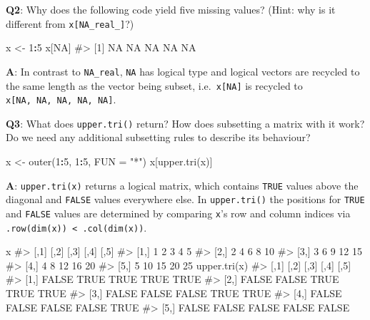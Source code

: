 \documentclass[
]{krantz}
\makeatletter
\newenvironment{Shaded}{\begin{snugshade}}{\end{snugshade}}
\newcommand{\CommentTok}[1]{\textcolor[rgb]{0.56,0.35,0.01}{\textit{#1}}}
\newcommand{\DataTypeTok}[1]{\textcolor[rgb]{0.13,0.29,0.53}{#1}}
\newcommand{\DecValTok}[1]{\textcolor[rgb]{0.00,0.00,0.81}{#1}}
\newcommand{\KeywordTok}[1]{\textcolor[rgb]{0.13,0.29,0.53}{\textbf{#1}}}
\newcommand{\NormalTok}[1]{#1}
\newcommand{\OperatorTok}[1]{\textcolor[rgb]{0.81,0.36,0.00}{\textbf{#1}}}
\newcommand{\OtherTok}[1]{\textcolor[rgb]{0.56,0.35,0.01}{#1}}
\newcommand{\StringTok}[1]{\textcolor[rgb]{0.31,0.60,0.02}{#1}}
\newenvironment{kframe}{%
\medskip{}
\setlength{\fboxsep}{.8em}
 \def\at@end@of@kframe{}%
 \ifinner\ifhmode%
  \def\at@end@of@kframe{\end{minipage}}%
  \begin{minipage}{\columnwidth}%
 \fi\fi%
 \def\FrameCommand##1{\hskip\@totalleftmargin \hskip-\fboxsep
 \colorbox{shadecolor}{##1}\hskip-\fboxsep
     \hskip-\linewidth \hskip-\@totalleftmargin \hskip\columnwidth}%
 \MakeFramed {\advance\hsize-\width
   \@totalleftmargin\z@ \linewidth\hsize
   \@setminipage}}%
 {\par\unskip\endMakeFramed%
 \at@end@of@kframe}
\renewenvironment{Shaded}{\begin{kframe}}{\end{kframe}}
\renewcommand{\KeywordTok} [1]{\textcolor[rgb]{0.00,0.44,0.13}{{#1}}}
\renewcommand{\DataTypeTok}[1]{\textcolor[rgb]{0.56,0.13,0.00}{{#1}}}
\renewcommand{\DecValTok}  [1]{\textcolor[rgb]{0.25,0.63,0.44}{{#1}}}
\renewcommand{\StringTok}  [1]{\textcolor[rgb]{0.25,0.44,0.63}{{#1}}}
\renewcommand{\CommentTok} [1]{\textcolor[rgb]{0.38,0.63,0.69}{{#1}}}
\renewcommand{\OtherTok}   [1]{\textcolor[rgb]{0.00,0.44,0.13}{{#1}}}
\renewcommand{\NormalTok}  [1]{{#1}}
\makeatother
\begin{document}
\textbf{{Q2}}: Why does the following code yield five missing values? (Hint: why is it different from \texttt{x{[}NA\_real\_{]}}?)

\begin{Shaded}
\begin{Highlighting}[]
\NormalTok{x <-}\StringTok{ }\DecValTok{1}\OperatorTok{:}\DecValTok{5}
\NormalTok{x[}\OtherTok{NA}\NormalTok{]}
\CommentTok{#> [1] NA NA NA NA NA}
\end{Highlighting}
\end{Shaded}

\textbf{{A}}: In contrast to \texttt{NA\_real}, \texttt{NA} has logical type and logical vectors are recycled to the same length as the vector being subset, i.e.~\texttt{x{[}NA{]}} is recycled to \texttt{x{[}NA,\ NA,\ NA,\ NA,\ NA{]}}.

\textbf{{Q3}}: What does \texttt{upper.tri()} return? How does subsetting a matrix with it work? Do we need any additional subsetting rules to describe its behaviour?

\begin{Shaded}
\begin{Highlighting}[]
\NormalTok{x <-}\StringTok{ }\KeywordTok{outer}\NormalTok{(}\DecValTok{1}\OperatorTok{:}\DecValTok{5}\NormalTok{, }\DecValTok{1}\OperatorTok{:}\DecValTok{5}\NormalTok{, }\DataTypeTok{FUN =} \StringTok{"*"}\NormalTok{)}
\NormalTok{x[}\KeywordTok{upper.tri}\NormalTok{(x)]}
\end{Highlighting}
\end{Shaded}

\textbf{{A}}: \texttt{upper.tri(x)} returns a logical matrix, which contains \texttt{TRUE} values above the diagonal and \texttt{FALSE} values everywhere else. In \texttt{upper.tri()} the positions for \texttt{TRUE} and \texttt{FALSE} values are determined by comparing \texttt{x}'s row and column indices via \texttt{.row(dim(x))\ \textless{}\ .col(dim(x))}.

\begin{Shaded}
\begin{Highlighting}[]
\NormalTok{x}
\CommentTok{#>      [,1] [,2] [,3] [,4] [,5]}
\CommentTok{#> [1,]    1    2    3    4    5}
\CommentTok{#> [2,]    2    4    6    8   10}
\CommentTok{#> [3,]    3    6    9   12   15}
\CommentTok{#> [4,]    4    8   12   16   20}
\CommentTok{#> [5,]    5   10   15   20   25}
\KeywordTok{upper.tri}\NormalTok{(x)}
\CommentTok{#>       [,1]  [,2]  [,3]  [,4]  [,5]}
\CommentTok{#> [1,] FALSE  TRUE  TRUE  TRUE  TRUE}
\CommentTok{#> [2,] FALSE FALSE  TRUE  TRUE  TRUE}
\CommentTok{#> [3,] FALSE FALSE FALSE  TRUE  TRUE}
\CommentTok{#> [4,] FALSE FALSE FALSE FALSE  TRUE}
\CommentTok{#> [5,] FALSE FALSE FALSE FALSE FALSE}
\end{Highlighting}
\end{Shaded}
\end{document}
